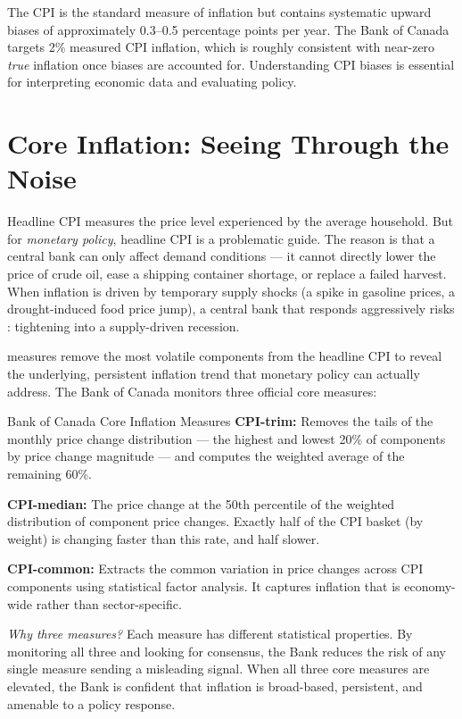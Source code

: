 \begin{keytakeaway}
The CPI is the standard measure of inflation but contains systematic
upward biases of approximately 0.3--0.5 percentage points per year.
The Bank of Canada targets 2\% measured CPI inflation, which is
roughly consistent with near-zero \textit{true} inflation once biases
are accounted for. Understanding CPI biases is essential for interpreting
economic data and evaluating policy.
\end{keytakeaway}

\section{Core Inflation: Seeing Through the Noise}
\label{sec:core_inflation}

Headline CPI measures the price level experienced by the average household.
But for \textit{monetary policy}, headline CPI is a problematic guide. The
reason is that a central bank can only affect demand conditions --- it cannot
directly lower the price of crude oil, ease a shipping container shortage,
or replace a failed harvest. When inflation is driven by temporary supply
shocks (a spike in gasoline prices, a drought-induced food price jump), a
central bank that responds aggressively risks : tightening
into a supply-driven recession.

 measures remove the most volatile components from
the headline CPI to reveal the underlying, persistent inflation trend that
monetary policy can actually address. The Bank of Canada monitors three
official core measures:

\begin{defbox}{Bank of Canada Core Inflation Measures}
\textbf{CPI-trim:} Removes the tails of the monthly price change
distribution --- the highest and lowest 20\% of components by price
change magnitude --- and computes the weighted average of the remaining
60\%.

\textbf{CPI-median:} The price change at the 50th percentile of the
weighted distribution of component price changes. Exactly half of the
CPI basket (by weight) is changing faster than this rate, and half
slower.

\textbf{CPI-common:} Extracts the common variation in price changes
across CPI components using statistical factor analysis. It captures
inflation that is economy-wide rather than sector-specific.

\textit{Why three measures?} Each measure has different statistical
properties. By monitoring all three and looking for consensus, the Bank
reduces the risk of any single measure sending a misleading signal.
When all three core measures are elevated, the Bank is confident that
inflation is broad-based, persistent, and amenable to a policy response.
\end{defbox}

